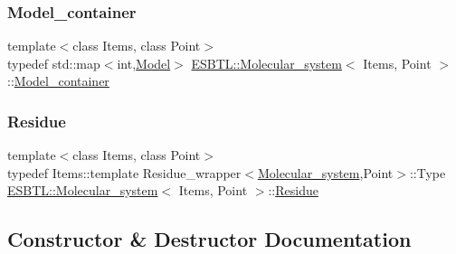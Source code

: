 \mbox{\label{classESBTL_1_1Molecular__system_a02d244045c99d943365db30208c8321d}} 
\subsubsection{\texorpdfstring{Model\+\_\+container}{Model\_container}}
{\footnotesize\ttfamily template$<$class Items, class Point$>$ \\
typedef std\+::map$<$int,\hyperlink{classESBTL_1_1Molecular__system_ac99c9f22457fd0498324fb5cfc276227}{Model}$>$ \hyperlink{classESBTL_1_1Molecular__system}{E\+S\+B\+T\+L\+::\+Molecular\+\_\+system}$<$ Items, Point $>$\+::\hyperlink{classESBTL_1_1Molecular__system_a02d244045c99d943365db30208c8321d}{Model\+\_\+container}}

\mbox{\label{classESBTL_1_1Molecular__system_a87f7fdfbb412bff03287ed8d1416b392}} 
\subsubsection{\texorpdfstring{Residue}{Residue}}
{\footnotesize\ttfamily template$<$class Items, class Point$>$ \\
typedef Items\+::template Residue\+\_\+wrapper$<$\hyperlink{classESBTL_1_1Molecular__system}{Molecular\+\_\+system},Point$>$\+::Type \hyperlink{classESBTL_1_1Molecular__system}{E\+S\+B\+T\+L\+::\+Molecular\+\_\+system}$<$ Items, Point $>$\+::\hyperlink{classESBTL_1_1Molecular__system_a87f7fdfbb412bff03287ed8d1416b392}{Residue}}



\subsection{Constructor \& Destructor Documentation}
\mbox{\label{classESBTL_1_1Molecular__system_a21e3d9c75113838a77ddf56f3222614c}} 
